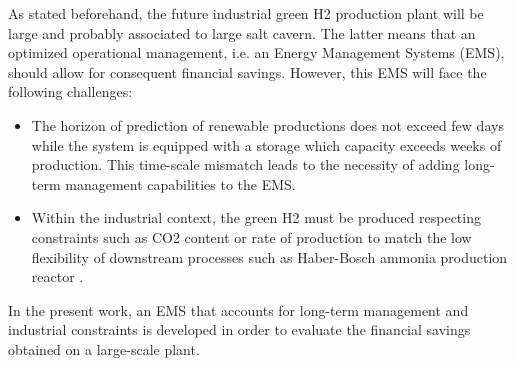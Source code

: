 As stated beforehand, the future industrial green H2 production plant will be large and probably associated to large salt cavern. The latter means that an optimized operational management, i.e. an Energy Management Systems (EMS), should allow for consequent financial savings. However, this EMS will face the following challenges: 
\begin{itemize}
    \item The horizon of prediction of renewable productions does not exceed few days while the system is equipped with a storage which capacity exceeds weeks of production. This time-scale mismatch leads to the necessity of adding long-term management capabilities to the EMS.
    \item Within the industrial context, the green H2 must be produced respecting constraints such as CO2 content \citep{green_hydrogen_organisation_green_2023} or rate of production to match the low flexibility of downstream processes such as Haber-Bosch ammonia production reactor \citep{shamiri_modeling_2021}.
\end{itemize}
In the present work, an EMS that accounts for long-term management and industrial constraints is developed in order to evaluate the financial savings obtained on a large-scale plant.

